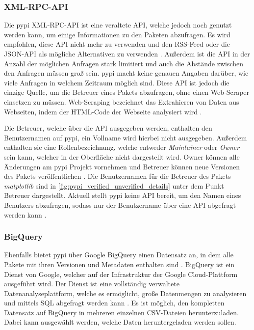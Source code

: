 \subsubsection*{XML-RPC-API}
\label{subsubsec:pypi_xml_rpc}
Die \gls{pypi} XML-RPC-API ist eine veraltete API, welche jedoch noch genutzt werden kann, um einige Informationen zu den Paketen abzufragen.
Es wird empfohlen, diese API nicht mehr zu verwenden und den RSS-Feed oder die JSON-API als mögliche Alternativen zu verwenden \autocite{python_software_foundation_warehouse_2024}.
Außerdem ist die API in der Anzahl der möglichen Anfragen stark limitiert und auch die Abstände zwischen den Anfragen müssen groß sein.
\gls{pypi} macht keine genauen Angaben darüber, wie viele Anfragen in welchem Zeitraum möglich sind.
Diese API ist jedoch die einzige Quelle, um die Betreuer eines Pakets abzufragen, ohne einen Web-Scraper einsetzen zu müssen.
Web-Scraping bezeichnet das Extrahieren von Daten aus Webseiten, indem der HTML-Code der Webseite analysiert wird \autocite{richardson_beautifulsoup4_2024}.

Die Betreuer, welche über die API ausgegeben werden, enthalten den Benutzernamen auf \gls{pypi}, ein Vollname wird hierbei nicht ausgegeben.
Außerdem enthalten sie eine Rollenbezeichnung, welche entweder \emph{Maintainer} oder \emph{Owner} sein kann, welcher in der Oberfläche nicht dargestellt wird.
Owner können alle Änderungen am \gls{pypi} Projekt vornehmen und Betreuer können neue Versionen des Pakets veröffentlichen \autocite{ingram_deprecate_2023}.
Die Benutzernamen für die Betreuer des Pakets \emph{matplotlib} sind in \autoref{fig:pypi_verified_unverified_details} unter dem Punkt \glqq Betreuer\grqq{} dargestellt.
Aktuell stellt \gls{pypi} keine API bereit, um den Namen eines Benutzers abzufragen, sodass nur der Benutzername über eine API abgefragt werden kann \autocite{python_software_foundation_add_2024}.

\subsubsection*{BigQuery}
\label{subsubsec:pypi_bigquery}
Ebenfalls bietet \gls{pypi} über Google BigQuery einen Datensatz an, in dem alle Pakete mit ihren Versionen und Metadaten enthalten sind \autocite{python_software_foundation_warehouse_2024}.
BigQuery ist ein Dienst von Google, welcher auf der Infrastruktur der Google Cloud-Plattform ausgeführt wird.
Der Dienst ist eine vollständig verwaltete Datenanalyseplattform, welche es ermöglicht, große Datenmengen zu analysieren und mittels SQL abgefragt werden kann \autocite{google_bigquery_2024}.
Es ist möglich, den kompletten Datensatz auf BigQuery in mehreren einzelnen CSV-Dateien herunterzuladen.
Dabei kann ausgewählt werden, welche Daten heruntergeladen werden sollen.

